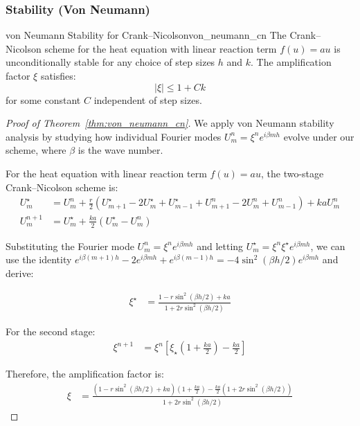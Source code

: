 \subsubsection{Stability (Von Neumann)}
\begin{theorem}{von Neumann Stability for Crank--Nicolson}{von_neumann_cn}
  The Crank--Nicolson scheme for the heat equation with linear reaction term $f(u) = au$ is unconditionally stable for any choice of step sizes $h$ and $k$. The amplification factor $\xi$ satisfies:
  \[
    |\xi| \leq 1 + Ck
  \]
  for some constant $C$ independent of step sizes.
\end{theorem}

\begin{proof}[Proof of Theorem~\ref{thm:von_neumann_cn}]
  We apply von Neumann stability analysis by studying how individual Fourier modes $U_m^n = \xi^n e^{i\beta mh}$ evolve under our scheme, where $\beta$ is the wave number.

  For the heat equation with linear reaction term $f(u) = au$, the two-stage Crank--Nicolson scheme is:
  \begin{align*}
    U_m^\star & = U_m^n + \frac{r}{2}\left(U_{m+1}^\star - 2U_m^\star + U_{m-1}^\star + U_{m+1}^n - 2U_m^n + U_{m-1}^n\right) + kaU_m^n \\
    U_m^{n+1} & = U_m^\star + \frac{ka}{2}(U_m^\star - U_m^n)
  \end{align*}

  Substituting the Fourier mode $U_m^n = \xi^n e^{i\beta mh}$ and letting $U_m^\star = \xi^n \xi^\star e^{i\beta mh}$, we can use the identity $e^{i\beta (m+1)h} - 2e^{i\beta mh} + e^{i\beta (m-1)h} = -4\sin^2(\beta h/2)e^{i\beta mh}$ and derive:

  \begin{align*}
    \xi^\star & = \frac{1 - r\sin^2(\beta h/2) + ka}{1 + 2r\sin^2(\beta h/2)}
  \end{align*}

  For the second stage:
  \begin{align*}
    \xi^{n+1} & = \xi^n\left[\xi_\star\left(1 + \frac{ka}{2}\right) - \frac{ka}{2}\right]
  \end{align*}

  Therefore, the amplification factor is:
  \begin{align*}
    \xi & = \frac{\left(1 - r\sin^2(\beta h/2) + ka\right)\left(1 + \frac{ka}{2}\right) - \frac{ka}{2}\left(1 + 2r\sin^2(\beta h/2)\right)}{1 + 2r\sin^2(\beta h/2)}
  \end{align*}


\end{proof}
